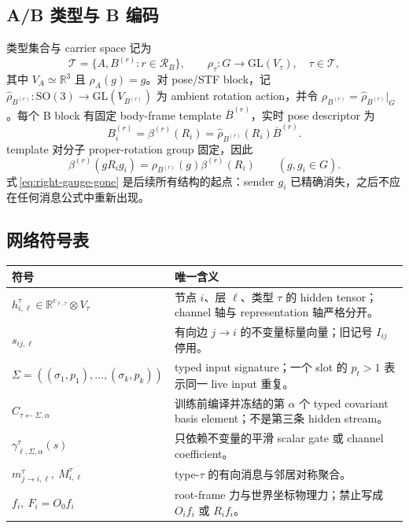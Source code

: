 \documentclass[11pt,a4paper,fontset=fandol]{ctexart}
\newcommand{\R}{\mathbb R}
\newcommand{\SO}{\mathrm{SO}}
\begin{document}
\subsection{A/B 类型与 B 编码}

类型集合与 carrier space 记为
\begin{equation}
  \mathscr T=\{A,B^{(r)}:r\in\mathcal R_B\},
  \qquad
  \rho_\tau:G\to \mathrm{GL}(V_\tau),\quad \tau\in\mathscr T,
\end{equation}
其中 $V_A\simeq\R^3$ 且 $\rho_A(g)=g$。对 pose/STF block，记
$\widehat\rho_{B^{(r)}}:\SO(3)\to\mathrm{GL}(V_{B^{(r)}})$ 为 ambient rotation action，并令
$\rho_{B^{(r)}}=\widehat\rho_{B^{(r)}}|_G$。每个 B block 有固定 body-frame template $\overline B^{(r)}$，实时 pose descriptor 为
\begin{equation}
  B_i^{(r)}=\beta^{(r)}(R_i)
  =\widehat\rho_{B^{(r)}}(R_i)\overline B^{(r)}.
  \label{eq:b-encode}
\end{equation}
template 对分子 proper-rotation group 固定，因此
\begin{equation}
  \boxed{
  \beta^{(r)}(gR_i g_i)
  =\rho_{B^{(r)}}(g)\beta^{(r)}(R_i)
  }
  \qquad(g,g_i\in G).
  \label{eq:right-gauge-gone}
\end{equation}
式\,\eqref{eq:right-gauge-gone} 是后续所有结构的起点：sender $g_i$ 已精确消失，之后不应在任何消息公式中重新出现。

\subsection{网络符号表}

\begin{center}
\small
\begin{tabularx}{\linewidth}{>{\raggedright\arraybackslash}p{.30\linewidth}X}
\toprule
符号 & 唯一含义 \\
\midrule
$h_{i,\ell}^{\tau}\in\R^{c_{\ell,\tau}}\otimes V_\tau$
& 节点 $i$、层 $\ell$、类型 $\tau$ 的 hidden tensor；channel 轴与 representation 轴严格分开。\\
$s_{ij,\ell}$ & 有向边 $j\to i$ 的不变量标量向量；旧记号 $I_{ij}$ 停用。\\
$\Sigma=((\sigma_1,p_1),\ldots,(\sigma_k,p_k))$
& typed input signature；一个 slot 的 $p_t>1$ 表示同一 live input 重复。\\
$C_{\tau\leftarrow\Sigma,\alpha}$
& 训练前编译并冻结的第 $\alpha$ 个 typed covariant basis element；不是第三条 hidden stream。\\
$\gamma_{\ell,\Sigma,\alpha}^{\tau}(s)$
& 只依赖不变量的平滑 scalar gate 或 channel coefficient。\\
$m_{j\to i,\ell}^{\tau},\ M_{i,\ell}^{\tau}$
& type-$\tau$ 的有向消息与邻居对称聚合。\\
$f_i,\ F_i=O_0f_i$
& root-frame 力与世界坐标物理力；禁止写成 $O_if_i$ 或 $R_if_i$。\\
\bottomrule
\end{tabularx}
\end{center}
\end{document}
